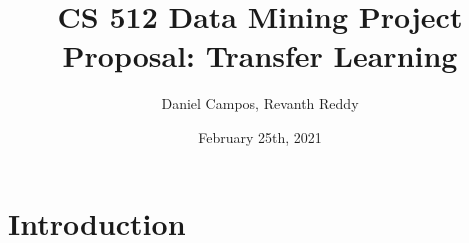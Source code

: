 \documentclass{article}
\title{CS 512 Data Mining Project Proposal: Transfer Learning}
\author{Daniel Campos, Revanth Reddy}
\date{February 25th, 2021}
\begin{document}
\maketitle

\section{Introduction}
\end{document}
